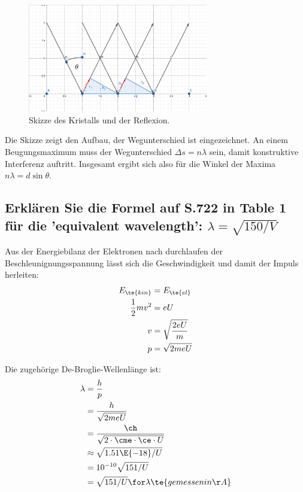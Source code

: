 \documentclass[ex,minted]{exercise}
\begin{document}
\begin{figure}[H]
    \centering
    \includegraphics[width=0.7\textwidth]{1.png}
    \caption{Skizze des Kristalls und der Reflexion.}
\end{figure}

Die Skizze zeigt den Aufbau, der Wegunterschied ist eingezeichnet.
An einem Beugungsmaximum muss der Wegunterschied \(\Delta s = n\lambda\) sein,
damit konstruktive Interferenz auftritt. Insgesamt ergibt sich also für die 
Winkel der Maxima \(n\lambda = d\sin\theta\).

\subsection{Erklären Sie die Formel auf S.722 in Table 1 für die 'equivalent wavelength':
\(\lambda=\sqrt{150/V}\)}

\dottedlinett

Aus der Energiebilanz der Elektronen nach durchlaufen der Beschleunignungsspannung
lässt sich die Geschwindigkeit und damit der Impuls herleiten:
\begin{align*}
    E_{\te{kin}} &= E_{\te{el}}\\
    \frac 12 mv^2 &= e U \\
    v &= \sqrt{\frac{2 e U}{m}} \\
    p &= \sqrt{2 m e U}
\end{align*}

Die zugehörige De-Broglie-Wellenlänge ist:
\begin{align*}
    \lambda &= \frac{h}{p} \\
    &= \frac{h}{\sqrt{2 m e U}}\\
    &= \frac{\ch}{\sqrt{2 \cdot \cme \cdot\ce \cdot U}} \\
    & \approx \sqrt{1.51\E{-18} /U}\\
    &= 10^{-10}\sqrt{151/U}\\
    &= \sqrt{151/U} \for \lambda \te{ gemessen in \r A}
\end{align*}
\end{document}

